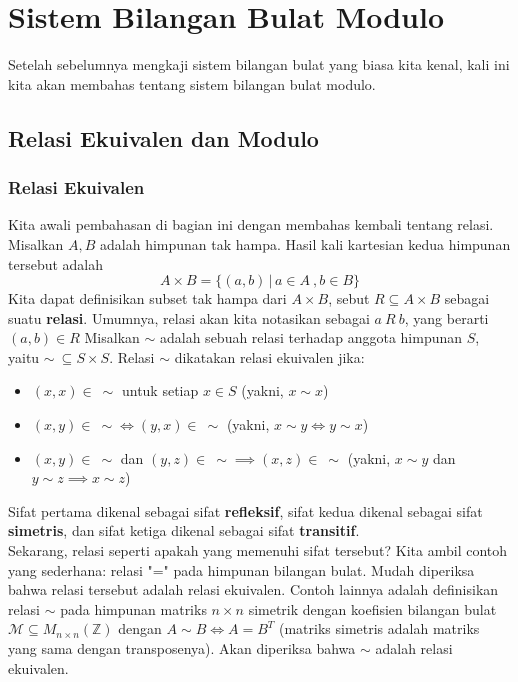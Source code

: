 \chapter{Sistem Bilangan Bulat Modulo}
	Setelah sebelumnya mengkaji sistem bilangan bulat yang biasa kita kenal, kali ini kita akan membahas tentang sistem bilangan bulat modulo.
	\section{Relasi Ekuivalen dan Modulo}
	\subsection{Relasi Ekuivalen}
	Kita awali pembahasan di bagian ini dengan membahas kembali tentang relasi. Misalkan $A,B$ adalah himpunan tak hampa. Hasil kali kartesian kedua himpunan tersebut adalah
	$$A \times B = \{(a,b) \, | \, a \in A \ , b \in B\}$$
	Kita dapat definisikan subset tak hampa dari $A\times B$, sebut $R \subseteq A\times B$ sebagai suatu \textbf{relasi}. Umumnya, relasi akan kita notasikan sebagai $a \ R \ b$, yang berarti $(a,b) \in R$
	Misalkan $\sim$ adalah sebuah relasi terhadap anggota himpunan $S$, yaitu $\sim \ \subseteq S \times S$. Relasi $\sim$ dikatakan relasi ekuivalen jika:
	\begin{itemize}
		\item $(x,x) \in \ \sim$ untuk setiap $x \in S$ (yakni, $x \sim x$)
		\item $(x,y) \in \ \sim \iff (y,x) \in \ \sim$ (yakni, $x \sim y \iff y \sim x$)
		\item $(x,y) \in \ \sim$ dan $(y,z) \in \ \sim \implies (x,z) \in \ \sim$ (yakni, $x \sim y$ dan $y \sim z \implies x \sim z$) 
	\end{itemize}
	Sifat pertama dikenal sebagai sifat \textbf{refleksif}, sifat kedua dikenal sebagai sifat \textbf{simetris}, dan sifat ketiga dikenal sebagai sifat \textbf{transitif}.
	\\

	Sekarang, relasi seperti apakah yang memenuhi sifat tersebut? Kita ambil contoh yang sederhana: relasi "=" pada himpunan bilangan bulat. Mudah diperiksa bahwa relasi tersebut adalah relasi ekuivalen. Contoh lainnya adalah definisikan relasi $\sim$ pada himpunan matriks $n \times n$ simetrik dengan koefisien bilangan bulat $\mathcal{M} \subseteq M_{n\times n}(\mathbb{Z})$ dengan $A \sim B \iff A = B^{T}$ (matriks simetris adalah matriks yang sama dengan transposenya). Akan diperiksa bahwa $\sim$ adalah relasi ekuivalen.
	\\
	
